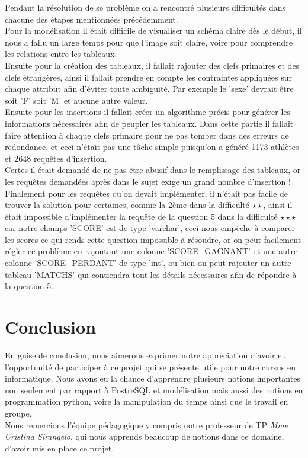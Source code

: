 \documentclass[]{scrreprt}
\begin{document}
		{\large 
			Pendant la résolution de se problème on a rencontré plusieurs difficultés dans chacune des étapes mentionnées précédemment.\\
			Pour la modélisation il était difficile de visualiser un schéma claire dès le début, il nous a fallu un large temps pour que l'image soit claire, voire pour comprendre les relations entre les tableaux.\\
			Ensuite pour la création des tableaux, il fallait rajouter des clefs primaires et des clefs étrangères, ainsi il fallait prendre en compte les contraintes appliquées sur chaque attribut afin d'éviter toute ambiguïté. Par exemple le 'sexe' devrait être soit 'F' soit 'M' et aucune autre valeur.\\
			Ensuite pour les insertions il fallait créer un algorithme précis pour générer les informations nécessaires afin de peupler les tableaux. Dans cette partie il fallait faire attention à chaque clefs primaire pour ne pas tomber dans des erreurs de redondance, et ceci n'était pas une tâche simple puisqu'on a généré 1173 athlètes et 2648 requêtes d'insertion.\\ 
			Certes il était demandé de ne pas être abusif dans le remplissage des tableaux, or les requêtes demandées après dans le sujet exige un grand nombre d'insertion !\\
			Finalement pour les requêtes qu'on devait implémenter, il n'était pas facile de trouver la solution pour certaines, comme la 2ème dans la difficulté $ \star \star $, ainsi il était impossible d'implémenter la requête de la question 5 dans la difficulté $ \star \star \star $ car notre champs 'SCORE' est de type 'varchar', ceci nous empêche à comparer les scores ce qui rends cette question impossible à résoudre, or on peut facilement régler ce problème en rajoutant une colonne 'SCORE\_GAGNANT' et une autre colonne 'SCORE\_PERDANT' de type 'int', ou bien on peut rajouter un autre tableau 'MATCHS' qui contiendra tout les détails nécessaires afin de répondre à la question 5. \\
			
			
			 
			
		}
		
	\chapter{Conclusion}
	\label{Chapter7}
	
		{\large En guise de conclusion, nous aimerons exprimer notre appréciation d'avoir eu l'opportunité de participer à ce projet qui se présente utile pour notre cursus en informatique. Nous avons eu la chance d'apprendre plusieurs notions importantes non seulement par rapport à PostreSQL et modélisation mais aussi des notions en programmation python, voire la manipulation du temps ainsi que le travail en groupe.\\
		Nous remercions l'équipe pédagogique y compris notre professeur de TP \textit{Mme Cristina Sirangelo}, qui nous apprends beaucoup de notions dans ce domaine, d'avoir mis en place ce projet.}
	
\end{document}
